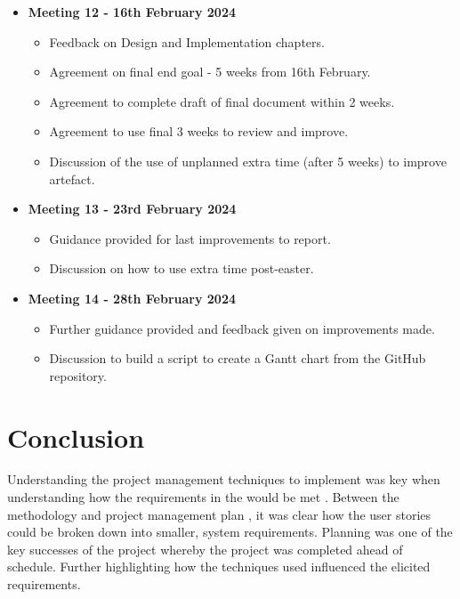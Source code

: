 \begin{itemize}
\begin{itemize}
    \end{itemize}
    \item \textbf{Meeting 12 - 16th February 2024}
    \begin{itemize}
        \item Feedback on Design and Implementation chapters.
        \item Agreement on final end goal - 5 weeks from 16th February.
        \item Agreement to complete draft of final document within 2 weeks.
        \item Agreement to use final 3 weeks to review and improve.
        \item Discussion of the use of unplanned extra time (after 5 weeks) to improve artefact.
    \end{itemize}
    \item \textbf{Meeting 13 - 23rd February 2024}
    \begin{itemize}
        \item Guidance provided for last improvements to report.
        \item Discussion on how to use extra time post-easter.
    \end{itemize}
    \item \textbf{Meeting 14 - 28th February 2024}
    \begin{itemize}
        \item Further guidance provided and feedback given on improvements made.
        \item Discussion to build a script to create a Gantt chart from the GitHub repository.
    \end{itemize}
\end{itemize}

\section{Conclusion}
\label{pm:conclusion}

Understanding the project management techniques to implement was key when understanding how the requirements in the would be met . Between the methodology  and project management plan , it was clear how the user stories could be broken down into smaller, system requirements. Planning was one of the key successes of the project whereby the project was completed ahead of schedule. Further highlighting how the techniques used influenced the elicited requirements.